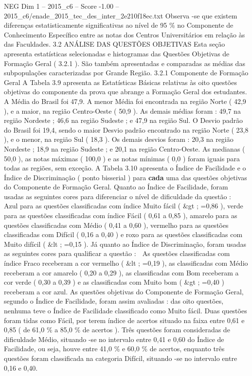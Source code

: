 \begin{textsample}{NEG Dim 1 – 2015\_c6 – Score -1.00 – 2015\_c6/enade\_2015\_tec\_des\_inter\_2e210f18ec.txt}
Observa -se que existem diferenças estatisticamente significativas ao nível de 95 \% no Componente de Conhecimento Específico entre as notas dos Centros Universitários em relação às das Faculdades. 3.2 ANÁLISE DAS QUESTÕES OBJETIVAS Esta seção apresenta estatísticas selecionadas e histogramas das Questões Objetivas de Formação Geral ( 3.2.1 ).
São também apresentadas e comparadas as médias das subpopulações caracterizadas por Grande Região. 3.2.1 Componente de Formação Geral A Tabela 3.9 apresenta as Estatísticas Básicas relativas às oito questões objetivas do componente da prova que abrange a Formação Geral dos estudantes.
A Média do Brasil foi 47,9.
A menor Média foi encontrada na região Norte ( 42,9 ), e a maior, na região Centro-Oeste ( 50,9 ).
As demais médias foram : 49,7 na região Nordeste ; 46,6 na região Sudeste ; e 47,9 na região Sul.
O Desvio padrão do Brasil foi 19,4, sendo o maior Desvio padrão encontrado na região Norte ( 23,8 ), e o menor, na região Sul ( 18,3 ).
Os demais desvios foram : 20,3 na região Nordeste ; 18,9 na região Sudeste ; e 20,1 na região Centro-Oeste.
As medianas ( 50,0 ), as notas máximas ( 100,0 ) e as notas mínimas ( 0,0 ) foram iguais para todas as regiões, sem exceção.
A Tabela 3.10 apresenta o Índice de Facilidade e o Índice de Discriminação ( ponto bisserial ) para \textbf{cada} uma das questões objetivas do Componente de Formação Geral.
Quanto ao Índice de Facilidade, foram usadas as seguintes cores para diferenciar o nível de dificuldade da questão :  Azul para as questões classificadas com índice Muito fácil ( \&gt ; =0,86 ), verde para as questões classificadas com índice Fácil ( 0,61 a 0,85 ), amarelo para as questões classificadas com Médio ( 0,41 a 0,60 ), vermelho para as questões classificadas com Difícil ( 0,16 a 0,40 ) e roxo para as questões classificadas com Muito difícil ( \&lt ; =0,15 ).
Já quanto ao Índice de Discriminação, foram usadas as seguintes cores para qualificar a questão :  As questões classificadas com índice Fraco receberam a cor vermelho ( \&lt ; =0,19 ), as classificadas com Médio receberam a cor amarelo ( 0,20 a 0,29 ), as classificadas com Bom receberam a cor verde ( 0,30 a 0,39 ) e as classificadas com Muito bom ( \&gt ; =0,40 ) receberam a cor azul.
As questões objetivas do Componente de Formação Geral, segundo o Índice de Facilidade, foram assim avaliadas : das oito questões, nenhuma teve o Índice de Facilidade classificado como Muito fácil.
Duas questões foram tidas como Fácil, por terem índice de acertos situado na faixa entre 0,61 e 0,85 ( de 61,0 \% a 85,0 \% de acertos ).
Três questões foram consideradas de dificuldade Médio, situando -se no intervalo entre 0,41 e 0,60 do Índice de Facilidade, ou seja, houve entre 41,0 \% e 60,0 \% de acertos, enquanto três questões foram classificada na categoria Difícil, situando -se no intervalo entre 0,16 e 0,40.

\end{textsample}
